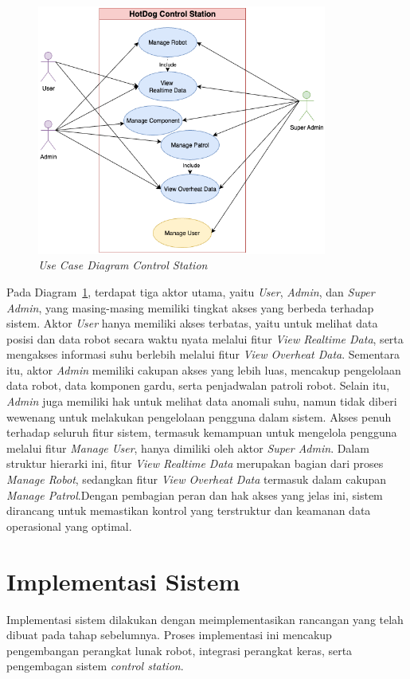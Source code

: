 \begin{figure}[H]
  \centering
  \includegraphics[width=0.85\textwidth]{gambar/bab3/usecase.png}
  \caption{\emph{Use Case Diagram} \emph{Control Station}}
  \label{fig:use-case-diagram}
\end{figure}

Pada Diagram~\ref{fig:use-case-diagram}, terdapat tiga aktor utama, yaitu \emph{User}, \emph{Admin}, dan \emph{Super Admin}, yang masing-masing memiliki tingkat akses yang berbeda terhadap sistem. Aktor \emph{User} hanya memiliki akses terbatas, yaitu untuk melihat data posisi dan data robot secara waktu nyata melalui fitur \emph{View Realtime Data}, serta mengakses informasi suhu berlebih melalui fitur \emph{View Overheat Data}. Sementara itu, aktor \emph{Admin} memiliki cakupan akses yang lebih luas, mencakup pengelolaan data robot, data komponen gardu, serta penjadwalan patroli robot. Selain itu, \emph{Admin} juga memiliki hak untuk melihat data anomali suhu, namun tidak diberi wewenang untuk melakukan pengelolaan pengguna dalam sistem. Akses penuh terhadap seluruh fitur sistem, termasuk kemampuan untuk mengelola pengguna melalui fitur \emph{Manage User}, hanya dimiliki oleh aktor \emph{Super Admin}. Dalam struktur hierarki ini, fitur \emph{View Realtime Data} merupakan bagian dari proses \emph{Manage Robot}, sedangkan fitur \emph{View Overheat Data} termasuk dalam cakupan \emph{Manage Patrol}.Dengan pembagian peran dan hak akses yang jelas ini, sistem dirancang untuk memastikan kontrol yang terstruktur dan keamanan data operasional yang optimal.


\section{Implementasi Sistem}
\sloppy
Implementasi sistem dilakukan dengan meimplementasikan rancangan yang telah dibuat pada tahap sebelumnya. Proses implementasi ini mencakup pengembangan perangkat lunak robot, integrasi perangkat keras, serta pengembagan sistem \emph{control station}.

